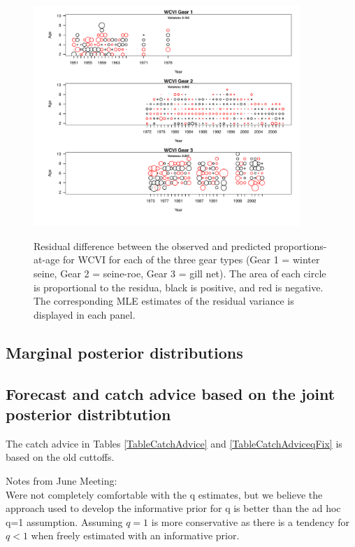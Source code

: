 \begin{figure}
	\centering
	\includegraphics[width=0.9\textwidth]{../FIGS/qPriorFigs/iscam_fig_agecompsresid_WCVI.pdf}\\
	\caption{Residual difference between the observed and predicted proportions-at-age for WCVI for each of the three gear types (Gear 1 = winter seine, Gear 2 = seine-roe, Gear 3 = gill net).  The area of each circle is proportional to the residua, black is positive, and red is negative.  The corresponding MLE estimates of the residual variance is displayed in each panel.}\label{PartII:Results:figAgeCompWCVI}
\end{figure}


\subsection{Marginal posterior distributions}

\subsection{Forecast and catch advice based on the joint posterior distribtution}
 The catch advice in Tables \ref{TableCatchAdvice} and \ref{TableCatchAdviceqFix} is based on the old cuttoffs.










Notes from June Meeting:\\
Were not completely comfortable with the q estimates, but we believe the approach used to develop the informative prior for q is better than the ad hoc q=1 assumption.  Assuming $q=1$ is more conservative as there is a tendency for $q<1$ when freely estimated with an informative prior.
